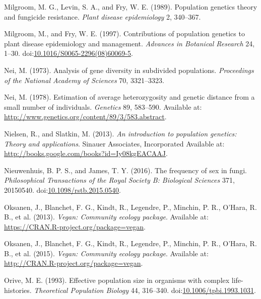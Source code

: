 \documentclass[double,12pt]{beavtex}
\begin{document}
  \hypertarget{ref-milgroom1989population}{}
  Milgroom, M. G., Levin, S. A., and Fry, W. E. (1989). Population
  genetics theory and fungicide resistance. \emph{Plant disease
  epidemiology} 2, 340--367.
  
  \hypertarget{ref-milgroom1997contributions}{}
  Milgroom, M., and Fry, W. E. (1997). Contributions of population
  genetics to plant disease epidemiology and management. \emph{Advances in
  Botanical Research} 24, 1--30.
  doi:\href{https://doi.org/10.1016/S0065-2296(08)60069-5}{10.1016/S0065-2296(08)60069-5}.
  
  \hypertarget{ref-nei1973analysis}{}
  Nei, M. (1973). Analysis of gene diversity in subdivided populations.
  \emph{Proceedings of the National Academy of Sciences} 70, 3321--3323.
  
  \hypertarget{ref-Nei:1978}{}
  Nei, M. (1978). Estimation of average heterozygosity and genetic
  distance from a small number of individuals. \emph{Genetics} 89,
  583--590. Available at:
  \url{http://www.genetics.org/content/89/3/583.abstract}.
  
  \hypertarget{ref-nielsen2013introduction}{}
  Nielsen, R., and Slatkin, M. (2013). \emph{An introduction to population
  genetics: Theory and applications}. Sinauer Associates, Incorporated
  Available at: \url{http://books.google.com/books?id=Iy08kgEACAAJ}.
  
  \hypertarget{ref-nieuwenhuis2016frequency}{}
  Nieuwenhuis, B. P. S., and James, T. Y. (2016). The frequency of sex in
  fungi. \emph{Philosophical Transactions of the Royal Society B:
  Biological Sciences} 371, 20150540.
  doi:\href{https://doi.org/10.1098/rstb.2015.0540}{10.1098/rstb.2015.0540}.
  
  \hypertarget{ref-oksanen2013vegan}{}
  Oksanen, J., Blanchet, F. G., Kindt, R., Legendre, P., Minchin, P. R.,
  O'Hara, R. B., et al. (2013). \emph{Vegan: Community ecology package}.
  Available at: \url{https://CRAN.R-project.org/package=vegan}.
  
  \hypertarget{ref-oksanen2015vegan}{}
  Oksanen, J., Blanchet, F. G., Kindt, R., Legendre, P., Minchin, P. R.,
  O'Hara, R. B., et al. (2015). \emph{Vegan: Community ecology package}.
  Available at: \url{http://CRAN.R-project.org/package=vegan}.
  
  \hypertarget{ref-orive1993effective}{}
  Orive, M. E. (1993). Effective population size in organisms with complex
  life-histories. \emph{Theoretical Population Biology} 44, 316--340.
  doi:\href{https://doi.org/10.1006/tpbi.1993.1031}{10.1006/tpbi.1993.1031}.
  
\end{document}
